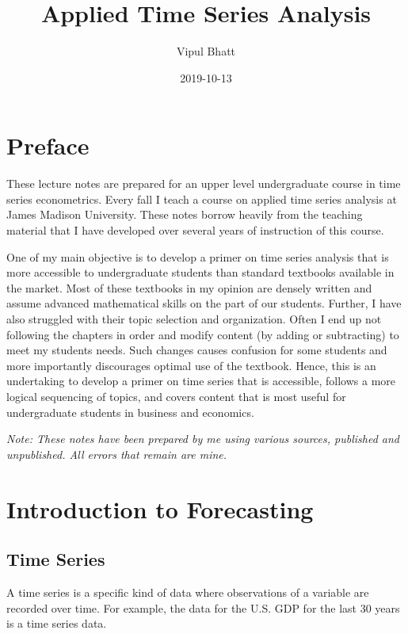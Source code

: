 \documentclass[]{book}
\title{Applied Time Series Analysis}
\author{Vipul Bhatt}
\date{2019-10-13}
\theoremstyle{definition}
\theoremstyle{definition}
\theoremstyle{definition}
\theoremstyle{remark}
\begin{document}
\maketitle

{
\setcounter{tocdepth}{1}
\tableofcontents
}
\hypertarget{preface}{%
\chapter*{Preface}\label{preface}}

These lecture notes are prepared for an upper level undergraduate course in time series econometrics. Every fall I teach a course on applied time series analysis at James Madison University. These notes borrow heavily from the teaching material that I have developed over several years of instruction of this course.

One of my main objective is to develop a primer on time series analysis that is more accessible to undergraduate students than standard textbooks available in the market. Most of these textbooks in my opinion are densely written and assume advanced mathematical skills on the part of our students. Further, I have also struggled with their topic selection and organization. Often I end up not following the chapters in order and modify content (by adding or subtracting) to meet my students needs. Such changes causes confusion for some students and more importantly discourages optimal use of the textbook. Hence, this is an undertaking to develop a primer on time series that is accessible, follows a more logical sequencing of topics, and covers content that is most useful for undergraduate students in business and economics.

\emph{Note: These notes have been prepared by me using various sources, published and unpublished. All errors that remain are mine.}

\hypertarget{intro}{%
\chapter{Introduction to Forecasting}\label{intro}}

\hypertarget{time-series}{%
\section{Time Series}\label{time-series}}

A time series is a specific kind of data where observations of a variable are recorded over time. For example, the data for the U.S. GDP for the last 30 years is a time series data.
\end{document}
